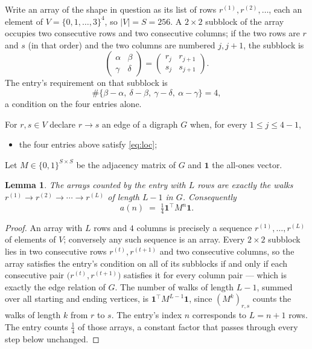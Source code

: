 \documentclass[11pt,a4paper]{article}
\theoremstyle{plain}
\newtheorem{lemma}[theorem]{Lemma}
\theoremstyle{definition}
\begin{document}
Write an array of the shape in question as its list of rows
$r^{(1)},r^{(2)},\dots$, each an element of
$V=\{0,1,\dots,3\}^{4}$, so $|V|=S=256$. A $2\times2$ subblock of the array
occupies two consecutive rows and two consecutive columns; if the two rows are $r$
and $s$ (in that order) and the two columns are numbered $j,j+1$,
the subblock is
\[
\begin{pmatrix}\alpha&\beta\\\gamma&\delta\end{pmatrix}=\begin{pmatrix}r_j&r_{j+1}\\s_j&s_{j+1}\end{pmatrix}.
\]
The entry's requirement on that subblock is
\begin{equation}\label{eq:loc}
\#\{\beta-\alpha,\ \delta-\beta,\ \gamma-\delta,\ \alpha-\gamma\}=4,
\end{equation}
a condition on the four entries alone.

For $r,s\in V$ declare $r\to s$ an edge of a digraph $G$ when, for every
$1\le j\le 4-1$,
\begin{itemize}
\item the four entries above satisfy \eqref{eq:loc};

\end{itemize}
Let $M\in\{0,1\}^{S\times S}$ be the adjacency matrix of $G$ and $\mathbf{1}$ the
all-ones vector.

\begin{lemma}\label{lem:walk}
The arrays counted by the entry with $L$ rows are exactly the walks
$r^{(1)}\to r^{(2)}\to\cdots\to r^{(L)}$ of length $L-1$ in $G$. Consequently
\[
a(n)\;=\;\tfrac1{4}\mathbf{1}^{\!\top}M^{n}\mathbf{1} .
\]
\end{lemma}

\begin{proof}
An array with $L$ rows and $4$ columns is precisely a sequence
$r^{(1)},\dots,r^{(L)}$ of elements of $V$; conversely any such sequence is an array.
Every $2\times2$ subblock lies in two consecutive rows $r^{(t)},r^{(t+1)}$ and two
consecutive columns, so the array satisfies the entry's condition on all of its subblocks
if and only if each consecutive pair $\bigl(r^{(t)},r^{(t+1)}\bigr)$ satisfies it for
every column pair --- which is exactly the edge relation of $G$. The number of walks of
length $L-1$, summed over all starting and ending vertices, is
$\mathbf{1}^{\!\top}M^{L-1}\mathbf{1}$, since $(M^{k})_{r,s}$ counts the walks of
length $k$ from $r$ to $s$. The entry's index $n$ corresponds to $L=n+1$ rows. The entry counts $\tfrac1{4}$ of those arrays, a constant factor that passes through every step below unchanged.
\end{proof}
\end{document}
